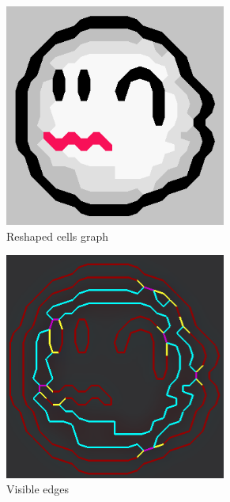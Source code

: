 \documentclass{article}
\begin{document}
\begin{figure}[h!]
\centering
    \begin{subfigure}[b]{0.3\textwidth}
        \includegraphics[width=0.8\textwidth]{4}
        \caption{ Reshaped cells graph }
        \label{fig:4}
    \end{subfigure}
    \begin{subfigure}[b]{0.3\textwidth}
        \includegraphics[width=0.8\textwidth]{vis}
        \caption{Visible edges}
        \label{fig:vis}
    \end{subfigure}
    \begin{subfigure}[b]{0.3\textwidth}

\end{subfigure}
\end{figure}
\end{document}
